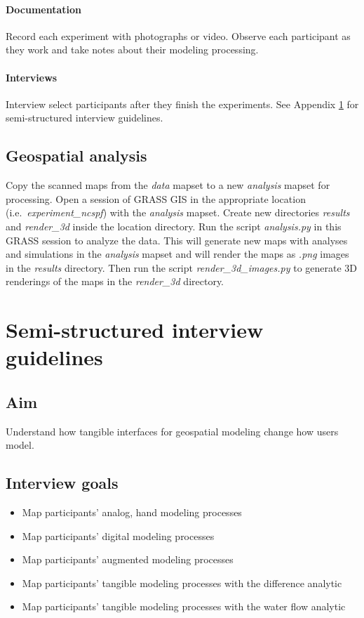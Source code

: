 \documentclass[prodmode,acmtochi]{acmsmall} %
\begin{document}
\paragraph{Documentation}
Record each experiment with photographs or video.
Observe each participant as they work
and take notes about their modeling processing.

\paragraph{Interviews}
Interview select participants after they finish the experiments. 
See Appendix \ref{appendix:guidelines} for semi-structured interview guidelines.

\subsection{Geospatial analysis}\label{appendix:analysis}
Copy the scanned maps from the \emph{data} mapset 
to a new \emph{analysis} mapset for processing. 
Open a session of GRASS GIS 
in the appropriate location (i.e.~\emph{experiment{\_ncspf}}) 
with the \emph{analysis} mapset.
Create new directories \emph{results} and \emph{render\_3d} 
inside the location directory.
Run the script \emph{analysis.py} in this GRASS session to analyze the data. 
This will generate new maps with analyses and simulations in the \emph{analysis} mapset
and will render the maps as \emph{.png} images in the \emph{results} directory.
Then run the script \emph{render\_3d\_images.py} 
to generate 3D renderings of the maps in the \emph{render\_3d} directory.

\vfill
\clearpage

\section{Semi-structured interview guidelines}\label{appendix:guidelines}
\vspace*{0.5em}

\subsection{Aim}
Understand how tangible interfaces for geospatial modeling change how users model.
\vspace*{0.5em}

\subsection{Interview goals}
\begin{itemize}
\item Map participants' analog, hand modeling processes
\item Map participants' digital modeling processes
\item Map participants' augmented modeling processes
\item Map participants' tangible modeling processes with the difference analytic
\item Map participants' tangible modeling processes with the water flow analytic
\end{itemize}
\vspace*{0.5em}
\end{document}
